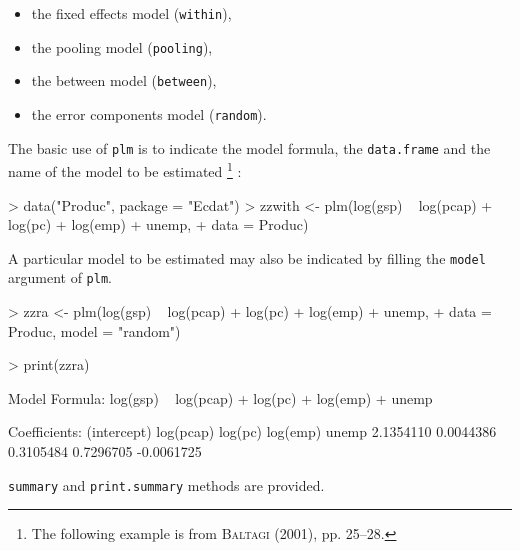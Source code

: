 \documentclass[a4paper]{article}
\begin{document}
\begin{itemize}
\item the fixed effects model (\texttt{within}),
\item the pooling model (\texttt{pooling}),
\item the between model (\texttt{between}),
\item the error components model (\texttt{random}).
\end{itemize}

The basic use of \texttt{plm} is to indicate the model formula, the
\texttt{data.frame} and the name of the model to be estimated
\footnote{The following example is from \textsc{Baltagi} (2001),
  pp. 25--28.} :

\begin{Schunk}
\begin{Sinput}
> data("Produc", package = "Ecdat")
> zzwith <- plm(log(gsp) ~ log(pcap) + log(pc) + log(emp) + unemp, 
+     data = Produc)
\end{Sinput}
\end{Schunk}

A particular model to be estimated may also be indicated by filling
the \texttt{model} argument of \texttt{plm}.

\begin{Schunk}
\begin{Sinput}
> zzra <- plm(log(gsp) ~ log(pcap) + log(pc) + log(emp) + unemp, 
+     data = Produc, model = "random")
\end{Sinput}
\end{Schunk}


\begin{Schunk}
\begin{Sinput}
> print(zzra)
\end{Sinput}
\begin{Soutput}
Model Formula: log(gsp) ~ log(pcap) + log(pc) + log(emp) + unemp

Coefficients:
(intercept)   log(pcap)     log(pc)    log(emp)       unemp 
  2.1354110   0.0044386   0.3105484   0.7296705  -0.0061725 
\end{Soutput}
\end{Schunk}

\texttt{summary} and \texttt{print.summary} methods are provided. 
\end{document}
